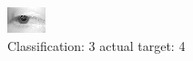 \begin{figure}[h!]
\begin{center}
\includegraphics[width=0.60\columnwidth]{figures/ID2683_class_3_target_4.png}
\end{center}
\caption{ Classification: 3 actual target: 4}
\label{fig:ID2683_class_3_target_4}
\end{figure}
